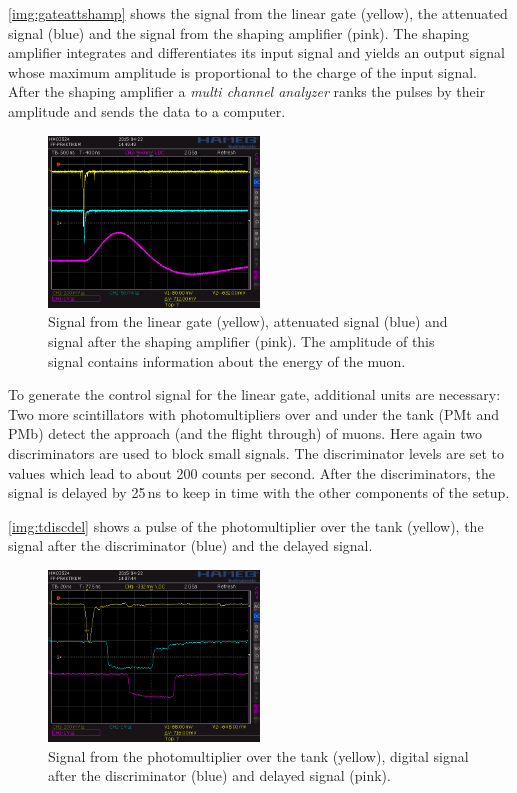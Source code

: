 \autoref{img:gateattshamp} shows the signal from the linear gate (yellow), the attenuated signal (blue) and
the signal from the shaping amplifier (pink).
The shaping amplifier integrates and differentiates its input signal and yields an output signal
whose maximum amplitude is proportional to the charge of the input signal.
After the shaping amplifier a \emph{multi channel analyzer} ranks the pulses by their amplitude
and sends the data to a computer.

\begin{figure}[H]
\begin{center}
  \includegraphics[width=0.5\textwidth]{../img/S0015.PNG}
  \caption{Signal from the linear gate (yellow), attenuated signal (blue) and signal after the shaping 
 amplifier (pink). The amplitude of this signal contains information about the energy of the muon.}
  \label{img:gateattshamp}
\end{center}
\end{figure}

To generate the control signal for the linear gate, additional units are necessary:
Two more scintillators with photomultipliers over and under the tank (PMt and PMb)
detect the approach (and the flight through) of muons.
Here again two discriminators are used to block small signals.
The discriminator levels are set to values which lead to about 200 counts per second.
After the discriminators, the signal is delayed by 25\,ns to keep in time with the other components
of the setup.

\autoref{img:tdiscdel} shows a pulse of 
the photomultiplier over the tank (yellow), the signal after the discriminator (blue) and
the delayed signal.


\begin{figure}[H]
\begin{center}
  \includegraphics[width=0.5\textwidth]{../img/S0006.PNG}
  \caption{Signal from the photomultiplier over the tank (yellow), digital signal after the discriminator (blue)
  and delayed signal (pink).}
  \label{img:tdiscdel}
\end{center}
\end{figure}

